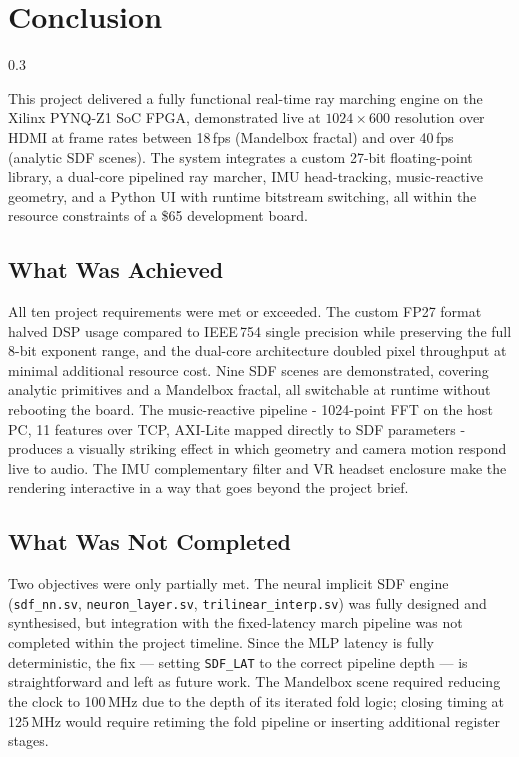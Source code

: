 \chapter{Conclusion}
\label{ch:conclusion}

\begin{spacing}{0.3}
\minitoc
\end{spacing}

\thesisspacing

This project delivered a fully functional real-time ray marching engine on the
Xilinx PYNQ-Z1 SoC FPGA, demonstrated live at $1024\times600$ resolution over
HDMI at frame rates between 18\,fps (Mandelbox fractal) and over 40\,fps
(analytic SDF scenes). The system integrates a custom 27-bit floating-point
library, a dual-core pipelined ray marcher, IMU head-tracking, music-reactive
geometry, and a Python UI with runtime bitstream switching, all within the
resource constraints of a \$65 development board.

\section{What Was Achieved}

All ten project requirements were met or exceeded. The custom FP27 format
halved DSP usage compared to IEEE\,754 single precision while preserving the
full 8-bit exponent range, and the dual-core architecture doubled pixel
throughput at minimal additional resource cost. Nine SDF scenes are
demonstrated, covering analytic primitives and a Mandelbox fractal, all
switchable at runtime without rebooting the board. The music-reactive pipeline
- 1024-point FFT on the host PC, 11 features over TCP, AXI-Lite mapped
directly to SDF parameters - produces a visually striking effect in which
geometry and camera motion respond live to audio. The IMU complementary filter
and VR headset enclosure make the rendering interactive in a way that goes
beyond the project brief.

\section{What Was Not Completed}

Two objectives were only partially met. The neural implicit SDF engine
(\texttt{sdf\_nn.sv}, \texttt{neuron\_layer.sv}, \texttt{trilinear\_interp.sv})
was fully designed and synthesised, but integration with the fixed-latency march
pipeline was not completed within the project timeline. Since the MLP latency is
fully deterministic, the fix --- setting \texttt{SDF\_LAT} to the correct
pipeline depth --- is straightforward and left as future work. The Mandelbox
scene required reducing the clock to 100\,MHz due to the depth of its iterated
fold logic; closing timing at 125\,MHz would require retiming the fold pipeline
or inserting additional register stages.

